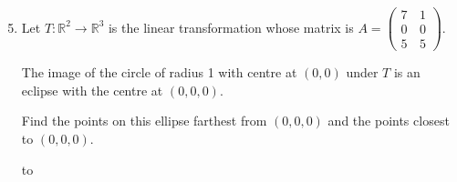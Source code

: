 \documentclass[a4paper,11pt]{article}
\newcommand{\hdotrule}[1]{\hbox to \textwidth{\leaders\hbox to #1pt{\hss . \hss}\hfil}}
\begin{document}
\begin{preview}
\begin{enumerate}
		\setcounter{enumi}{4}
		\item Let $T : \mathbb{R}^2 \rightarrow \mathbb{R}^3$ is the linear transformation whose matrix is $A = \begin{pmatrix}
			  7 &\, 1 \\ 0 &\, 0 \\ 5 &\, 5 
		\end{pmatrix}$. 
		
		The image of the circle of radius 1 with centre at $(0,0)$ under $T$ is an eclipse with the centre at $(0,0,0)$. 
		
		Find the points on this ellipse farthest from $(0,0,0)$ and the points closest to $(0,0,0)$.

		\hdotrule{5}

	\end{enumerate}


\end{preview}
\end{document}
